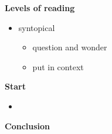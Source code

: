 \begin{frame}

\textbf{Levels of reading}\vspace{0.5cm}
\begin{itemize}\setlength\itemsep{1em}
  \item syntopical\medskip
  \begin{itemize}\setlength\itemsep{1em}
  \item question and wonder
  \item put in context
  \end{itemize}
\end{itemize}

\end{frame}
\begin{frame}\textbf{Start}\vspace{0.5cm}

\begin{itemize}\setlength\itemsep{1em}
\item {}
\end{itemize}

\end{frame}
\begin{frame}\begin{center}
\LARGE\textbf{Conclusion}
\end{center}\end{frame}

